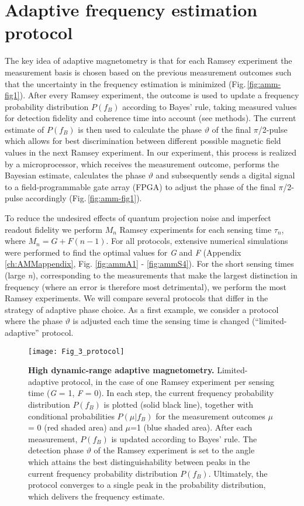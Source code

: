 \section{Adaptive frequency estimation protocol}
The key idea of adaptive magnetometry is that for each Ramsey experiment the measurement basis is chosen based on the previous measurement outcomes such that the uncertainty in the frequency estimation is minimized (Fig.\,\ref{fig:amm-fig1}). After every Ramsey experiment, the outcome is used to update a frequency probability distribution $P(f_B)$ according to Bayes’ rule, taking measured values for detection fidelity and coherence time into account (see methods). The current estimate of $P(f_B)$ is then used to calculate the phase $\vartheta$ of the final $\pi$/2-pulse which allows for best discrimination between different possible magnetic field values in the next Ramsey experiment\cite{Cappellaro_Phys.Rev.A_2012}. In our experiment, this process is realized by a microprocessor, which receives the measurement outcome, performs the Bayesian estimate, calculates the  phase $\vartheta$ and subsequently sends a digital signal to a field-programmable gate array (FPGA) to adjust the phase of the final $\pi$/2-pulse accordingly (Fig.\,\ref{fig:amm-fig1}).

To reduce the undesired effects of quantum projection noise and imperfect readout fidelity we perform $M_n$ Ramsey experiments\cite{Said_Phys.Rev.B_2011} for each sensing time $\tau_n$, where  $M_n = G + F (n-1)$. For all protocols, extensive numerical simulations were performed to find the optimal values for \textit{G} and \textit{F} (Appendix \ref{ch:AMMappendix}, Fig. \ref{fig:ammA1} - \ref{fig:ammS4}). For the short sensing times (large \textit{n}), corresponding to the measurements that make the largest distinction in frequency (where an error is therefore most detrimental), we  perform the most Ramsey experiments. We will compare several protocols that differ in the strategy of adaptive phase choice. As a first example, we consider a protocol where the phase $\vartheta$ is adjusted each time the sensing time is changed (“limited-adaptive” protocol. 

\begin{figure*}
	\centering
	\texttt{[image: Fig\_3\_protocol]}
	\caption{\label{fig:amm-fig3} \textbf{High dynamic-range adaptive magnetometry.} Limited-adaptive protocol, in the case of one Ramsey experiment per sensing time (\textit{G} = 1, \textit{F} = 0). In each step, the current frequency probability distribution $P(f_B)$ is plotted (solid black line), together with conditional probabilities $P(\mu|f_B)$ for the measurement outcomes $\mu$ = 0 (red shaded area) and $\mu$=1 (blue shaded area). After each measurement,  $P(f_B)$ is updated according to Bayes’ rule. The detection phase $\vartheta$ of the Ramsey experiment is set to the angle which attains the best distinguishability between peaks in the current frequency probability distribution $P(f_B)$. Ultimately, the protocol converges to a single peak in the probability distribution, which delivers the frequency estimate.}
\end{figure*}

